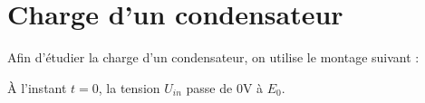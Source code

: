 \chapter{Charge d'un condensateur}

Afin d'étudier la charge d'un condensateur, on utilise le montage suivant :

\begin{center}

\end{center}

À l'instant $t=0$, la tension $U_{in}$ passe de 0V à $E_0$.
